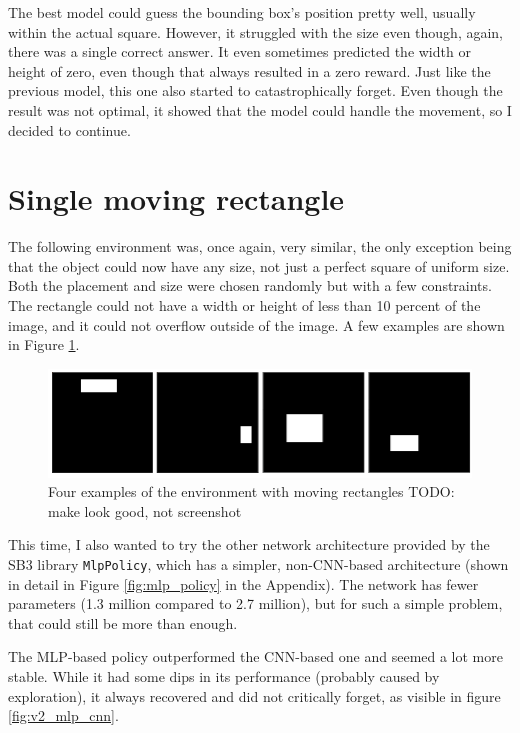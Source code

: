 \documentclass[
  digital,     %
  oneside,     %
  nosansbold,  %
  nocolorbold, %
  lof,         %
  lot,         %
]{fithesis4}
\begin{document}
The best model could guess the bounding box's position pretty well, usually within the actual square. However, it struggled with the size even though, again, there was a single correct answer. It even sometimes predicted the width or height of zero, even though that always resulted in a zero reward. Just like the previous model, this one also started to catastrophically forget. Even though the result was not optimal, it showed that the model could handle the movement, so I decided to continue.

\section{Single moving rectangle}
\label{sec:moving_rectangle}
The following environment was, once again, very similar, the only exception being that the object could now have any size, not just a perfect square of uniform size. Both the placement and size were chosen randomly but with a few constraints. The rectangle could not have a width or height of less than 10 percent of the image, and it could not overflow outside of the image. A few examples are shown in Figure \ref{fig:env2}.

\begin{figure}
    \includegraphics[width=1\linewidth]{env_examples/env2.png}
    \caption{Four examples of the environment with moving rectangles TODO: make look good, not screenshot}
    \label{fig:env2}
\end{figure}

This time, I also wanted to try the other network architecture provided by the SB3 library \texttt{MlpPolicy}, which has a simpler, non-CNN-based architecture (shown in detail in Figure \ref{fig:mlp_policy} in the Appendix). The network has fewer parameters (1.3 million compared to 2.7 million), but for such a simple problem, that could still be more than enough.

The MLP-based policy outperformed the CNN-based one and seemed a lot more stable. While it had some dips in its performance (probably caused by exploration), it always recovered and did not critically forget, as visible in figure \ref{fig:v2_mlp_cnn}.
\end{document}
